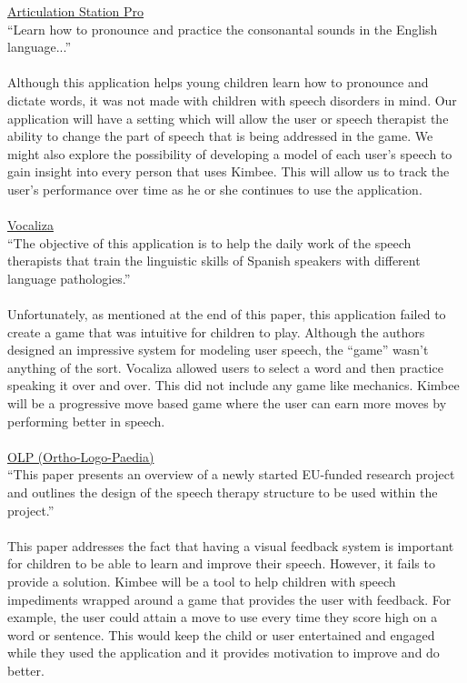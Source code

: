 \documentclass{article}
\begin{document}
\href{https://itunes.apple.com/us/app/articulation-station-pro/id491998279}{Articulation Station Pro}\\
``Learn how to pronounce and practice the consonantal sounds in the English language...''\\\\
Although this application helps young children learn how to pronounce and dictate words, it was not made with children with speech disorders in mind. Our application will have a setting which will allow the user or speech therapist the ability to change the part of speech that is being addressed in the game. We might also explore the possibility of developing a model of each user’s speech to gain insight into every person that uses Kimbee. This will allow us to track the user’s performance over time as he or she continues to use the application.\\\\
\href{http://dihana.cps.unizar.es/~alborada/docu/2006cvaquero.pdf}{Vocaliza}\\
``The objective of this application is to help the daily work of the speech therapists that train the linguistic skills of Spanish speakers with different language pathologies.''\\\\
Unfortunately, as mentioned at the end of this paper, this application failed to create a game that was intuitive for children to play. Although the authors designed an impressive system for modeling user speech, the “game” wasn’t anything of the sort. Vocaliza allowed users to select a word and then practice speaking it over and over. This did not include any game like mechanics. Kimbee will be a progressive move based game where the user can earn more moves by performing better in speech.\\\\
\href{http://www.speech.kth.se/prod/publications/files/841.pdf}{OLP (Ortho-Logo-Paedia)}\\
``This paper presents an overview of a newly started EU-funded research project and outlines the design of the speech therapy structure to be used within the project.''\\\\
This paper addresses the fact that having a visual feedback system is important for children to be able to learn and improve their speech. However, it fails to provide a solution. Kimbee will be a tool to help children with speech impediments wrapped around a game that provides the user with feedback. For example, the user could attain a move to use every time they score high on a word or sentence. This would keep the child or user entertained and engaged while they used the application and it provides motivation to improve and do better.
\end{document}
